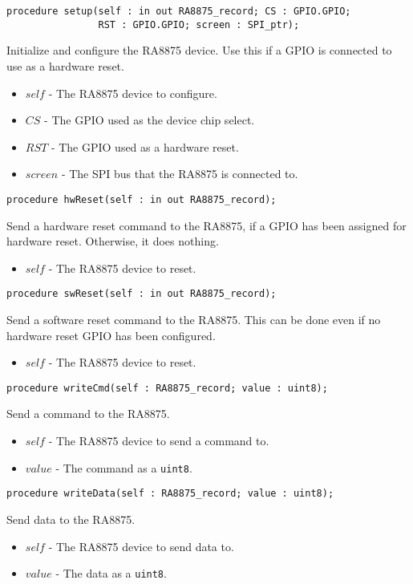 \documentclass[10pt, openany]{book}
\newcommand{\datatype}[1]{\texttt{#1}}
\begin{document}
\begin{lstlisting}
procedure setup(self : in out RA8875_record; CS : GPIO.GPIO;
                RST : GPIO.GPIO; screen : SPI_ptr);
\end{lstlisting}
Initialize and configure the RA8875 device.  Use this if a GPIO is connected to use as a hardware reset.
\begin{itemize}
  \item $self$ - The RA8875 device to configure.
  \item $CS$ - The GPIO used as the device chip select.
  \item $RST$ - The GPIO used as a hardware reset.
  \item $screen$ - The SPI bus that the RA8875 is connected to.
\end{itemize}

\begin{lstlisting}
procedure hwReset(self : in out RA8875_record);
\end{lstlisting}
Send a hardware reset command to the RA8875, if a GPIO has been assigned for hardware reset.  Otherwise, it does nothing.
\begin{itemize}
  \item $self$ - The RA8875 device to reset.
\end{itemize}

\begin{lstlisting}
procedure swReset(self : in out RA8875_record);
\end{lstlisting}
Send a software reset command to the RA8875.  This can be done even if no hardware reset GPIO has been configured.
\begin{itemize}
  \item $self$ - The RA8875 device to reset.
\end{itemize}

\begin{lstlisting}
procedure writeCmd(self : RA8875_record; value : uint8);
\end{lstlisting}
Send a command to the RA8875.
\begin{itemize}
  \item $self$ - The RA8875 device to send a command to.
  \item $value$ - The command as a \datatype{uint8}.
\end{itemize}

\begin{lstlisting}
procedure writeData(self : RA8875_record; value : uint8);
\end{lstlisting}
Send data to the RA8875.
\begin{itemize}
  \item $self$ - The RA8875 device to send data to.
  \item $value$ - The data as a \datatype{uint8}.
\end{itemize}
\end{document}
